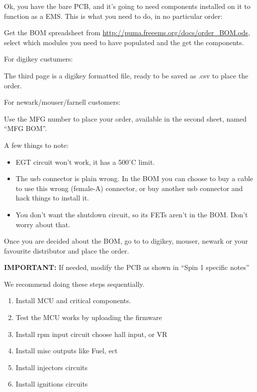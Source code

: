 \documentclass[12pt,a4paper,titlepage]{article}
\begin{document}
Ok, you have the bare PCB, and it's going to need components installed on it to function as a EMS. This is what you need to do, in no particular order:
\newline

Get the BOM spreadsheet from \url{http://puma.freeems.org/docs/order_BOM.ods}, select which modules you need to have populated and the get the components.
\newline

For digikey custumers:

The third page is a digikey formatted file, ready to be saved as .csv to place the order.
\newline

For newark/mouser/farnell customers:

Use the MFG number to place your order, available in the second sheet, named ``MFG BOM''.



A few things to note:
\begin{itemize}
\item EGT circuit won't work, it has a 500$^{\circ}$C limit.
\item The usb connector is plain wrong. In the BOM you can choose to buy a cable to use this wrong (female-A) connector, or buy another usb connector and hack things to install it.
\item You don't want the shutdown circuit, so its FETs aren't in the BOM. Don't worry about that.
\end{itemize}

Once you are decided about the BOM, go to to digikey, mouser, newark or your favourite distributor and place the order.
\newline

\textbf{IMPORTANT:} If needed, modify the PCB as shown in ``Spin 1 specific notes''
\newline

We recommend doing these steps sequentially.

\begin{enumerate}
\item Install MCU and critical components.
\item Test the MCU works by uploading the firmware
\item Install rpm input circuit choose hall input, or VR
\item Install misc outputs like Fuel, ect
\item Install injectors circuits
\item Install ignitions circuits
\end{enumerate}
\end{document}
